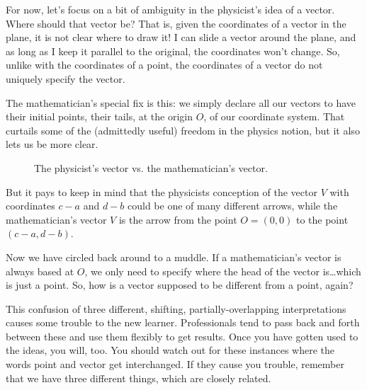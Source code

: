 \documentclass[00-livre-main.tex]{subfiles}
\begin{document}
For now, let's focus on a bit of ambiguity in the physicist's idea of a vector. 
Where should that vector be?
That is, given the coordinates of a vector in the plane, it is not clear where to draw it!
I can slide a vector around the plane, and as long as I keep it parallel to the original, the coordinates won't change. 
So, unlike with the coordinates of a point, the coordinates of a vector do not uniquely specify the vector.

The mathematician's special fix is this: we simply declare all our vectors to have their initial points, their tails, at the origin $O$, of our coordinate system.
That curtails some of the (admittedly useful) freedom in the physics notion, but it also lets us be more clear.

\begin{figure}[h]
\centering
{}
\caption{The physicist's vector vs. the mathematician's vector.}
\end{figure}

But it pays to keep in mind that the physicists conception of the vector $V$ with coordinates $c-a$ and $d-b$ could be one of many different arrows, while the mathematician's vector $V$ is the arrow from the point $O = (0,0)$ to the point $(c-a, d-b)$.

Now we have circled back around to a muddle. If a mathematician's vector is always based at $O$, we only need to specify where the head of the vector is\dots which is just a point. So, how is a vector supposed to be different from a point, again? 

This confusion of three different, shifting, partially-overlapping interpretations causes some trouble to the new learner. Professionals tend to pass back and forth between these and use them flexibly to get results. Once you have gotten used to the ideas, you will, too. You should watch out for these instances where the words point and vector get interchanged. If they cause you trouble, remember that we have three different things, which are closely related.
\end{document}

